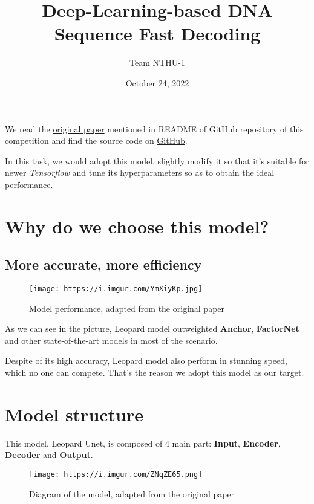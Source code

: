 \documentclass[
]{article}
\title{Deep-Learning-based DNA Sequence Fast Decoding}
\author{Team NTHU-1}
\date{October 24, 2022}
\begin{document}
\maketitle

We read the
\href{https://www.ncbi.nlm.nih.gov/pmc/articles/PMC8015851/}{original
paper} mentioned in README of GitHub repository of this competition and
find the source code on
\href{https://github.com/GuanLab/Leopard}{GitHub}.

In this task, we would adopt this model, slightly modify it so that it's
suitable for newer \emph{Tensorflow} and tune its hyperparameters so as
to obtain the ideal performance.

\hypertarget{why-do-we-choose-this-model}{%
\section{Why do we choose this
model?}\label{why-do-we-choose-this-model}}

\hypertarget{more-accurate-more-efficiency}{%
\subsection{More accurate, more
efficiency}\label{more-accurate-more-efficiency}}

\begin{figure}
\centering
\texttt{[image: https://i.imgur.com/YmXiyKp.jpg]}
\caption{Model performance, adapted from the original paper}
\end{figure}

As we can see in the picture, Leopard model outweighted \textbf{Anchor},
\textbf{FactorNet} and other state-of-the-art models in most of the
scenario.

Despite of its high accuracy, Leopard model also perform in stunning
speed, which no one can compete. That's the reason we adopt this model
as our target.

\hypertarget{model-structure}{%
\section{Model structure}\label{model-structure}}

This model, Leopard Unet, is composed of 4 main part: \textbf{Input},
\textbf{Encoder}, \textbf{Decoder} and \textbf{Output}.

\begin{figure}
\centering
\texttt{[image: https://i.imgur.com/ZNqZE65.png]}
\caption{Diagram of the model, adapted from the original paper}
\end{figure}
\end{document}
